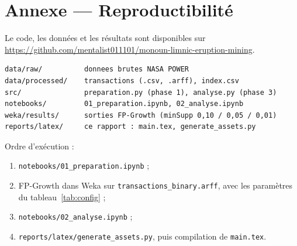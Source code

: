 \documentclass[12pt, a4paper]{article}
\begin{document}
\newpage
\section*{Annexe — Reproductibilité}

Le code, les données et les résultats sont disponibles sur
\url{https://github.com/mentalist011101/monoun-limnic-eruption-mining}.

\begin{code}
\begin{verbatim}
data/raw/          donnees brutes NASA POWER
data/processed/    transactions (.csv, .arff), index.csv
src/               preparation.py (phase 1), analyse.py (phase 3)
notebooks/         01_preparation.ipynb, 02_analyse.ipynb
weka/results/      sorties FP-Growth (minSupp 0,10 / 0,05 / 0,01)
reports/latex/     ce rapport : main.tex, generate_assets.py
\end{verbatim}
\end{code}

\noindent Ordre d'exécution :
\begin{enumerate}
  \item \texttt{notebooks/01\_preparation.ipynb} ;
  \item FP-Growth dans Weka sur \texttt{transactions\_binary.arff}, avec les paramètres du
        tableau~\ref{tab:config} ;
  \item \texttt{notebooks/02\_analyse.ipynb} ;
  \item \texttt{reports/latex/generate\_assets.py}, puis compilation de \texttt{main.tex}.
\end{enumerate}
\end{document}

